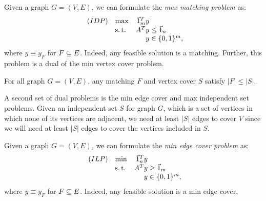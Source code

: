 \begin{defn}
    \label{def:max-matching-formulation}
    Given a graph $G=(V,E)$, we can formulate the \textit{max matching problem} as:
        \begin{equation*}
        \begin{array}{llr@{}l@{}}
            (IDP)   & \max  &   \one_m^T y  &               \\
                    & \st   &       A^T y   &{}\le \one_n   \\
                    &       &       y       &{}\in \{0,1\}^m,
        \end{array}
        \end{equation*}
    where $y \equiv y_F$ for $F \subseteq E$. Indeed, any feasible solution is a matching. Further, this problem is a dual of the min vertex cover problem.
\end{defn}

\begin{thm}
    \label{thm:weak-duality-min-vtx-cover-max-matching}
    For all graph $G = (V,E)$, any matching $F$ and vertex cover $S$ satisfy $|F| \le |S|$.
\end{thm}

A second set of dual problems is the min edge cover and max independent set problems. Given an independent set $S$ for graph $G$, which is a set of vertices in which none of its vertices are adjacent, we need at least $|S|$ edges to cover $V$ since we will need at least $|S|$ edges to cover the vertices included in $S$.

\begin{defn}
    \label{def:min-edge-cover-formulation}
    Given a graph $G=(V,E)$, we can formulate the \textit{min edge cover problem} as:
        \begin{equation*}
        \begin{array}{llr@{}l@{}}
            (ILP)   & \min  &   \one_n^T y  &               \\
                    & \st   &       A^T y   &{}\ge \one_m   \\
                    &       &       y       &{}\in \{0,1\}^m,
        \end{array}
        \end{equation*}
    where $y \equiv y_F$ for $F \subseteq E$. Indeed, any feasible solution is a min edge cover.
\end{defn}

